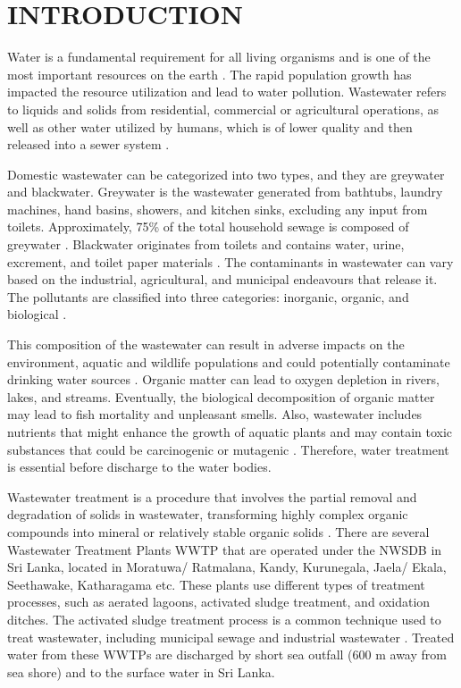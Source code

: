 \newpage
{}
\section{INTRODUCTION}
Water is a fundamental requirement for all living organisms and is one of the most important resources on the earth \cite{Smarzewska2021}. The rapid population growth has impacted the resource utilization and lead to water pollution. Wastewater refers to liquids and solids from residential, commercial or agricultural operations, as well as other water utilized by humans, which is of lower quality and then released into a sewer system \cite{Prasad2020}.

Domestic wastewater can be categorized into two types, and they are greywater and blackwater. Greywater is the wastewater generated from bathtubs, laundry machines, hand basins, showers, and kitchen sinks, excluding any input from toilets. Approximately, 75\% of the total household sewage is composed of greywater \cite{Eriksson2002}. Blackwater originates from toilets and contains water, urine, excrement, and toilet paper materials \cite{Paulo2013}. The contaminants in wastewater can vary based on the industrial, agricultural, and municipal endeavours that release it. The pollutants are classified into three categories: inorganic, organic, and biological \cite{Sangeetha2023}.

This composition of the wastewater can result in adverse impacts on the environment, aquatic and wildlife populations and could potentially contaminate drinking water sources \cite{Smarzewska2021}. Organic matter can lead to oxygen depletion in rivers, lakes, and streams. Eventually, the biological decomposition of organic matter may lead to fish mortality and unpleasant smells. Also, wastewater includes nutrients that might enhance the growth of aquatic plants and may contain toxic substances that could be carcinogenic or mutagenic \cite{Prasad2020}. Therefore, water treatment is essential before discharge to the water bodies.

Wastewater treatment is a procedure that involves the partial removal and degradation of solids in wastewater, transforming highly complex organic compounds into mineral or relatively stable organic solids \cite{Sonune2004}. There are several Wastewater Treatment Plants \ac{WWTP} that are operated under the \ac{NWSDB} in Sri Lanka, located in Moratuwa/ Ratmalana, Kandy, Kurunegala, Jaela/ Ekala, Seethawake, Katharagama etc. These plants use different types of treatment processes, such as aerated lagoons, activated sludge treatment, and oxidation ditches. The activated sludge treatment process is a common technique used to treat wastewater, including municipal sewage and industrial wastewater \cite{AGUILAR2013} \cite{Chukwu2018}. Treated water from these \ac{WWTP}s are discharged by short sea outfall (600 m away from sea shore) and to the surface water in Sri Lanka.

